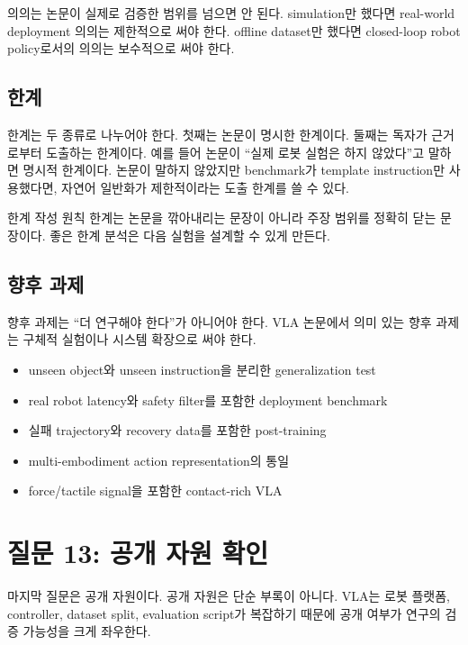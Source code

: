 의의는 논문이 실제로 검증한 범위를 넘으면 안 된다. simulation만 했다면 real-world deployment 의의는 제한적으로 써야 한다. offline dataset만 했다면 closed-loop robot policy로서의 의의는 보수적으로 써야 한다.

\subsection{한계}

한계는 두 종류로 나누어야 한다. 첫째는 논문이 명시한 한계이다. 둘째는 독자가 근거로부터 도출하는 한계이다. 예를 들어 논문이 ``실제 로봇 실험은 하지 않았다''고 말하면 명시적 한계이다. 논문이 말하지 않았지만 benchmark가 template instruction만 사용했다면, 자연어 일반화가 제한적이라는 도출 한계를 쓸 수 있다.

\begin{warningbox}{한계 작성 원칙}
한계는 논문을 깎아내리는 문장이 아니라 주장 범위를 정확히 닫는 문장이다. 좋은 한계 분석은 다음 실험을 설계할 수 있게 만든다.
\end{warningbox}

\subsection{향후 과제}

향후 과제는 ``더 연구해야 한다''가 아니어야 한다. VLA 논문에서 의미 있는 향후 과제는 구체적 실험이나 시스템 확장으로 써야 한다.

\begin{itemize}
  \item unseen object와 unseen instruction을 분리한 generalization test
  \item real robot latency와 safety filter를 포함한 deployment benchmark
  \item 실패 trajectory와 recovery data를 포함한 post-training
  \item multi-embodiment action representation의 통일
  \item force/tactile signal을 포함한 contact-rich VLA
\end{itemize}

\section{질문 13: 공개 자원 확인}

마지막 질문은 공개 자원이다. 공개 자원은 단순 부록이 아니다. VLA는 로봇 플랫폼, controller, dataset split, evaluation script가 복잡하기 때문에 공개 여부가 연구의 검증 가능성을 크게 좌우한다.

